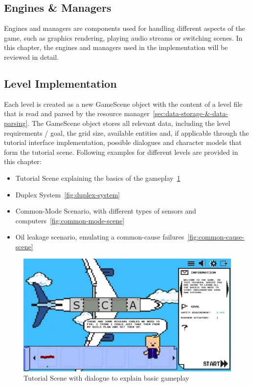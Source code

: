 \subsection{Engines \& Managers}\label{subsec:engines}
Engines and managers are components used for handling different aspects of the game, such as graphics rendering, playing audio streams
or switching scenes.
In this chapter, the engines and managers used in the implementation will be reviewed in detail.

\subsection{Level Implementation}\label{subsec:level-implementation}
Each level is created as a new GameScene object with the content of a level file that is read and parsed by the resource
manager~\ref{sec:data-storage-&-data-parsing}.
The GameScene object stores all relevant data, including the level requirements / goal, the grid size, available entities and, if applicable through the
tutorial interface implementation, possible dialogues and character models that form the tutorial scene.
Following examples for different levels are provided in this chapter:
\begin{itemize}
    \item Tutorial Scene explaining the basics of the gameplay~\ref{fig:basic-gameplay-tutorial}
    \item Duplex System~\ref{fig:duplex-system}
    \item Common-Mode Scenario, with different types of sensors and computers~\ref{fig:common-mode-scene}
    \item Oil leakage scenario, emulating a common-cause failures~\ref{fig:common-cause-scene}
\end{itemize}
\begin{figure}
    \centering
    \includegraphics[width=\textwidth]{Pictures/res/implementation/scenes/tutorial-game-scene}
    \caption{Tutorial Scene with dialogue to explain basic gameplay}
    \label{fig:basic-gameplay-tutorial}
\end{figure}
